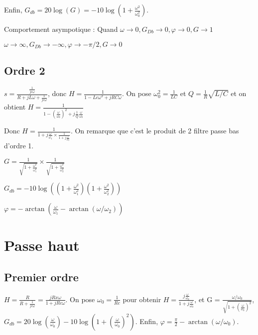 \documentclass[french]{yLectureNote}
\begin{document}
Enfin, \(G_{db} = 20\log(G) = -10 \log(1+\frac{\omega^2}{\omega_0^2})\).

Comportement asympotique : Quand \(\omega \to 0, G_{Db} \to 0, \varphi \to 0, G\to 1\)

\(\omega \to \infty, G_{Db} \to -\infty, \varphi \to -\pi/2, G\to 0\)


\subsection{Ordre 2}
\(s = \frac{\frac{1}{jc\omega}}{R+jL\omega+\frac{1}{jc\omega}}\), donc \(H = \frac{1}{1-Lc\omega^2+jRC\omega}\). On pose \(\omega^2_0 = \frac{1}{LC}\) et \(Q = \frac{1}{R}\sqrt{L/C}\) et on obtient \(H = \frac{1}{1-(\frac{\omega}{\omega_0})^2 + j\frac{1}{Q}\frac{\omega}{\omega_0}}\)


Donc \(H = \frac{1}{1+j\frac{\omega}{\omega_1}\times \frac{1}{1+j\frac{\omega}{\omega_2}}}\). On remarque que c'est le produit de 2 filtre passe bas d'ordre 1.

\(G = \frac{1}{\sqrt{1+\frac{\omega^2}{\omega_1^2}}} \times \frac{1}{\sqrt{1+\frac{\omega^2}{\omega_2^2}}}\)

\(G_{db} = -10\log((1+\frac{\omega^2}{\omega_1^2})(1+\frac{\omega^2}{\omega_2^2}))\)

\(\varphi = -\arctan(\frac{\omega}{\omega_1}-\arctan(\omega/\omega_2))\)

\section{Passe haut}
\subsection{Premier ordre}
\(H = \frac{R}{R + \frac{1}{jc\omega}} = \frac{jRx\omega}{1+jRc\omega}\). On pose \(\omega_0 = \frac{1}{Rc}\) pour obtenir \(H = \frac{j\frac{\omega}{\omega_0}}{1+j\frac{\omega}{\omega_0}}\), et G = \(\frac{\omega/\omega_0}{\sqrt{1+(\frac{\omega}{\omega_0})^2}}\), \(G_{db} = 20 \log(\frac{\omega}{\omega_0})-10\log(1+(\frac{\omega}{\omega_0})^2)\). Enfin, \(\varphi = \frac{\pi}{2}-\arctan(\omega/\omega_0)\).
\end{document}

